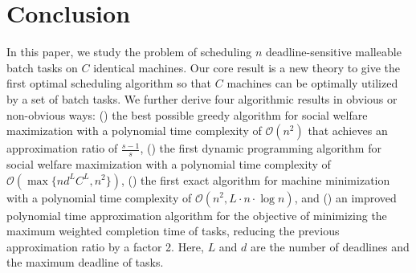 \documentclass[10pt,journal,compsoc]{IEEEtran}
\newcommand{\rmnum}[1]{\romannumeral #1}
\begin{document}
\section{Conclusion}
\label{sec.conclusion}


In this paper, we study the problem of scheduling $n$ deadline-sensitive malleable batch tasks on $C$ identical machines. Our core result is a new theory to give the first optimal scheduling algorithm so that $C$ machines can be optimally utilized by a set of batch tasks. We further derive four algorithmic results in obvious or non-obvious ways: (\rmnum{1}) the best possible greedy algorithm for social welfare maximization with a polynomial time complexity of $\mathcal{O}(n^{2})$ that achieves an approximation ratio of $\frac{s-1}{s}$, (\rmnum{2}) the first dynamic programming algorithm for social welfare maximization with a polynomial time complexity of $\mathcal{O}(\max\{nd^{L}C^{L}, n^{2}\})$, (\rmnum{3}) the first exact algorithm for machine minimization with a polynomial time complexity of $\mathcal{O}(n^{2}, L\cdot n\cdot \log{n})$, and (\rmnum{4}) an improved polynomial time approximation algorithm for the objective of minimizing the maximum weighted completion time of tasks, reducing the previous approximation ratio by a factor 2. Here, $L$ and $d$ are the number of deadlines and the maximum deadline of tasks.
\end{document}
